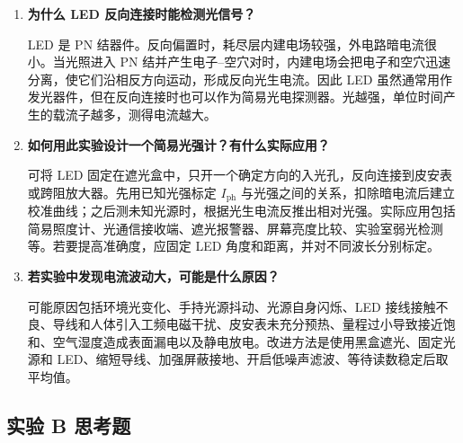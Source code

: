 \documentclass[11pt]{article}
\begin{document}
\begin{enumerate}
    \item \textbf{为什么 LED 反向连接时能检测光信号？}

    LED 是 PN 结器件。反向偏置时，耗尽层内建电场较强，外电路暗电流很小。当光照进入 PN 结并产生电子--空穴对时，内建电场会把电子和空穴迅速分离，使它们沿相反方向运动，形成反向光生电流。因此 LED 虽然通常用作发光器件，但在反向连接时也可以作为简易光电探测器。光越强，单位时间产生的载流子越多，测得电流越大。

    \item \textbf{如何用此实验设计一个简易光强计？有什么实际应用？}

    可将 LED 固定在遮光盒中，只开一个确定方向的入光孔，反向连接到皮安表或跨阻放大器。先用已知光强标定 $I_{\mathrm{ph}}$ 与光强之间的关系，扣除暗电流后建立校准曲线；之后测未知光源时，根据光生电流反推出相对光强。实际应用包括简易照度计、光通信接收端、遮光报警器、屏幕亮度比较、实验室弱光检测等。若要提高准确度，应固定 LED 角度和距离，并对不同波长分别标定。

    \item \textbf{若实验中发现电流波动大，可能是什么原因？}

    可能原因包括环境光变化、手持光源抖动、光源自身闪烁、LED 接线接触不良、导线和人体引入工频电磁干扰、皮安表未充分预热、量程过小导致接近饱和、空气湿度造成表面漏电以及静电放电。改进方法是使用黑盒遮光、固定光源和 LED、缩短导线、加强屏蔽接地、开启低噪声滤波、等待读数稳定后取平均值。
\end{enumerate}

\subsection{实验 B 思考题}
\end{document}
